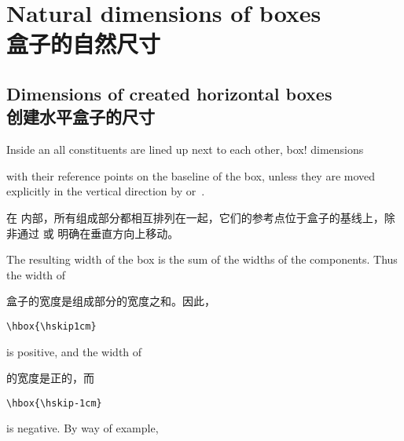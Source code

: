 \documentclass[twoside,letterpaper]{rapport3}
\begin{document}


\setcounter{chapter}{4} 

\section{Natural dimensions of boxes\\盒子的自然尺寸}

\subsection{Dimensions of created horizontal boxes\\创建水平盒子的尺寸}

Inside an  all constituents are lined up next to each other,
\term box! dimensions\par
with their reference points on the baseline of the box,
unless they are moved explicitly in the vertical direction
by  or~.

在  内部，所有组成部分都相互排列在一起，它们的参考点位于盒子的基线上，除非通过  或  明确在垂直方向上移动。

The resulting width of the box is the sum of the widths
of the components. Thus the width of

盒子的宽度是组成部分的宽度之和。因此，
\begin{verbatim}
\hbox{\hskip1cm}
\end{verbatim}
is positive, and the width of

的宽度是正的，而 

\begin{verbatim}
\hbox{\hskip-1cm}
\end{verbatim}
is negative. By way of example,
\end{document}
